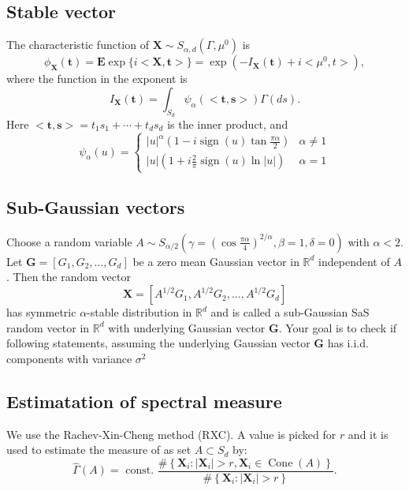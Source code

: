 \documentclass{article}
\begin{document}
	\subsection{Stable vector}
	The characteristic function of $\mathbf{X} \sim S_{\alpha, d}\left(\Gamma, \mu^0\right)$ is
	$$
	\phi_{\mathbf{X}}(\mathbf{t})=\mathbf{E} \exp \{i<\mathbf{X}, \mathbf{t}>\}=\exp \left(-I_{\mathbf{X}}(\mathbf{t})+i<\mu^0, t>\right),
	$$
	where the function in the exponent is
	$$
	I_{\mathbf{X}}(\mathbf{t})=\int_{S_d} \psi_\alpha(<\mathbf{t}, \mathbf{s}>) \Gamma(d s) .
	$$
	Here $<\mathbf{t}, \mathbf{s}>=t_1 s_1+\cdots+t_d s_d$ is the inner product, and
	$$
	\psi_\alpha(u)= \begin{cases}|u|^\alpha\left(1-i \operatorname{sign}(u) \tan \frac{\pi \alpha}{2}\right) & \alpha \neq 1 \\ |u|\left(1+i \frac{2}{\pi} \operatorname{sign}(u) \ln |u|\right) & \alpha=1\end{cases}
	$$
	
	\subsection{Sub-Gaussian vectors}\label{formula1}
	Choose a random variable $A \sim S_{\alpha / 2}\left(\gamma=\left(\cos \frac{\pi \alpha}{4}\right)^{2 / \alpha}, \beta=1, \delta=0\right)$ with $\alpha<2$. Let $\mathbf{G}=\left[G_1, G_2, \ldots, G_d\right]$ be a zero mean Gaussian vector in $\mathbb{R}^d$ independent of $A$. Then the random vector
	$$
	\mathbf{X}=\left[A^{1 / 2} G_1, A^{1 / 2} G_2, \ldots, A^{1 / 2} G_d\right]
	$$
	has symmetric $\alpha$-stable distribution in $\mathbb{R}^d$ and is called a sub-Gaussian SaS random vector in $\mathbb{R}^d$ with underlying Gaussian vector $\mathbf{G}$.
	Your goal is to check if following statements, assuming the underlying Gaussian vector $\mathbf{G}$ has i.i.d. components with variance $\sigma^2$
	
	

	\subsection{Estimatation of spectral measure}
	We use the Rachev-Xin-Cheng method (RXC). A value is picked for $r$ and it is used to estimate the measure of as set $A \subset S_d$ by:
	$$
	\widehat{\Gamma}(A)=\text { const. } \frac{\#\left\{\mathbf{X}_i:\left|\mathbf{X}_i\right|>r, \mathbf{X}_i \in \operatorname{Cone}(A)\right\}}{\#\left\{\mathbf{X}_i:\left|\mathbf{X}_i\right|>r\right\}} .
	$$
	
\end{document}
